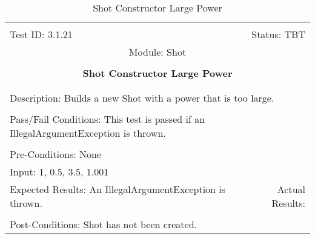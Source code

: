\documentclass[titlepage]{article}
\begin{document}
\begin{center}%
\begin{table}[h!]
\begin{tabular}{|l r|}\hline&\\[-2mm]
	Test ID: 3.1.21	&Status: TBT\\[-3mm]
	\multicolumn{2}{|c|}{Module: Shot}\\&\\
	\multicolumn{2}{|c|}{\textbf{\large{Shot Constructor Large Power}}}\\&\\\hline&\\[-3mm]
	\multicolumn{2}{|p{\textwidth}|}{Description: Builds a new Shot with a power that is too large.}\\[1mm]\hline&\\[-3mm]
	\multicolumn{2}{|p{\textwidth}|}{Pass/Fail Conditions: This test is passed if an IllegalArgumentException is thrown.}\\[1mm]\hline&\\[-3mm]
	\multicolumn{2}{|p{\textwidth}|}{Pre-Conditions: None}\\[4mm]
	\multicolumn{2}{|p{\textwidth}|}{Input: 1, 0.5, 3.5, 1.001}\\[2mm]\hline
	\multicolumn{1}{|p{0.49\textwidth}}{Expected Results: An IllegalArgumentException is thrown.}	&\multicolumn{1}{|p{0.45\textwidth}|}{Actual Results: }\\\hline&\\[-3mm]
	\multicolumn{2}{|p{\textwidth}|}{Post-Conditions: Shot has not been created.}\\\hline
\end{tabular}
\caption{Shot Constructor Large Power}
\end{table}
\end{center}
\newpage
\end{document}

